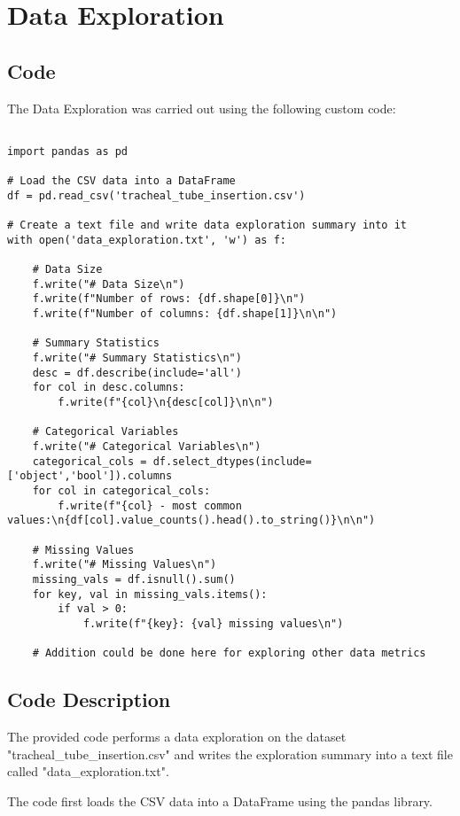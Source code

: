 \documentclass[11pt]{article}
\begin{document}
\section{Data Exploration}
\subsection{{Code}}
The Data Exploration was carried out using the following custom code:

\begin{verbatim}

import pandas as pd

# Load the CSV data into a DataFrame
df = pd.read_csv('tracheal_tube_insertion.csv')

# Create a text file and write data exploration summary into it
with open('data_exploration.txt', 'w') as f:

    # Data Size
    f.write("# Data Size\n")
    f.write(f"Number of rows: {df.shape[0]}\n")
    f.write(f"Number of columns: {df.shape[1]}\n\n")

    # Summary Statistics
    f.write("# Summary Statistics\n")
    desc = df.describe(include='all')
    for col in desc.columns:
        f.write(f"{col}\n{desc[col]}\n\n")

    # Categorical Variables
    f.write("# Categorical Variables\n")
    categorical_cols = df.select_dtypes(include=['object','bool']).columns
    for col in categorical_cols:
        f.write(f"{col} - most common values:\n{df[col].value_counts().head().to_string()}\n\n")

    # Missing Values
    f.write("# Missing Values\n")
    missing_vals = df.isnull().sum()
    for key, val in missing_vals.items():
        if val > 0:
            f.write(f"{key}: {val} missing values\n")
            
    # Addition could be done here for exploring other data metrics

\end{verbatim}

\subsection{Code Description}

The provided code performs a data exploration on the dataset "tracheal\_tube\_insertion.csv" and writes the exploration summary into a text file called "data\_exploration.txt".

The code first loads the CSV data into a DataFrame using the pandas library. 
\end{document}
